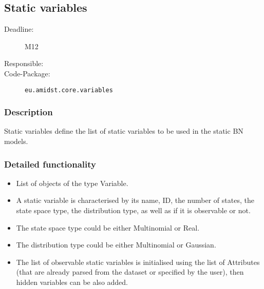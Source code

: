 \subsection{Static variables}
\label{Functionality:ID}

\begin{description}
\item[Deadline:] M12
\item[Responsible:]
\item[Code-Package:] \texttt{eu.amidst.core.variables}
\end{description}

\subsubsection*{Description}

Static variables define the list of static variables to be used in the static BN models.  

\subsubsection*{Detailed functionality}

\begin{itemize}
\item List of objects of the type Variable. 

\item A static variable is characterised by its name, ID, the number of states, the state space type, the distribution type, as well as if it is observable or not.

\item The state space type could be either Multinomial or Real.

\item The distribution type could be either Multinomial or Gaussian.

\item The list of observable static variables is initialised using the list of Attributes (that are already parsed from the dataset or specified by the user), then hidden variables can be also added.

\end{itemize}
